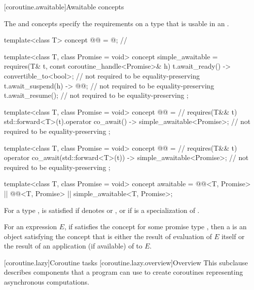 {\color{addclr}
\setcounter{subsection}{6}
[coroutine.awaitable]{Awaitable concepts}

\pnum
The  and  concepts
specify the requirements on a type
that is usable in an .

\begin{itemdecl}
template<class T>
concept @@ = @\seebelownc@; // \expos

template<class T, class Promise = void>
concept simple_awaitable = requires(T& t, const coroutine_handle<Promise>& h) {
  { t.await_ready() } -> convertible_to<bool>; // not required to be equality-preserving
  { t.await_suspend(h) } -> @@; // not required to be equality-preserving
  t.await_resume(); // not required to be equality-preserving
};

template<class T, class Promise = void>
concept @@ = // \expos
  requires(T&& t) {
    { std::forward<T>(t).operator co_await() }
      -> simple_awaitable<Promise>; // not required to be equality-preserving
  };

template<class T, class Promise = void>
concept @@ = // \expos
  requires(T&& t) {
    { operator co_await(std::forward<T>(t)) }
      -> simple_awaitable<Promise>; // not required to be equality-preserving
  };

template<class T, class Promise = void>
concept awaitable = @@<T, Promise> ||
  @@<T, Promise> || simple_awaitable<T, Promise>;
\end{itemdecl}

\begin{itemdescr}
\pnum
For a type ,
 is satisfied
if  denotes  or , or
if  is a specialization of .

\pnum
For an expression $E$,
if  satisfies
the  concept
for some promise type ,
then a  is
an object satisfying the  concept
that is either the result of evaluation of $E$ itself
or the result of an application (if available)
of  to $E$.
\end{itemdescr}

[coroutine.lazy]{Coroutine tasks}
[coroutine.lazy.overview]{Overview}
\pnum
This subclause describes components that a program can use
to create coroutines representing asynchronous computations.

}
